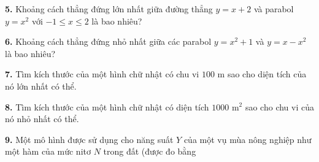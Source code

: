 \documentclass[10pt]{article}
\begin{document}
\begin{minipage}[t]{0.48\textwidth}
\vspace{6pt}
\hangindent=13pt
\textbf{5.} Khoảng cách thẳng đứng lớn nhất giữa đường thẳng $y = x + 2$ và parabol $y = x^2$ với $-1 \leqslant x \leqslant 2$ là bao nhiêu?

\vspace{6pt}
\hangindent=13pt
\textbf{6.} Khoảng cách thẳng đứng nhỏ nhất giữa các parabol $y = x^2 + 1$ và $y = x - x^2$ là bao nhiêu?

\vspace{6pt}
\hangindent=13pt
\textbf{7.} Tìm kích thước của một hình chữ nhật có chu vi $100\text{ m}$ sao cho diện tích của nó lớn nhất có thể.

\vspace{6pt}
\hangindent=13pt
\textbf{8.} Tìm kích thước của một hình chữ nhật có diện tích $1000\text{ m}^2$ sao cho chu vi của nó nhỏ nhất có thể.

\vspace{6pt}
\hangindent=13pt
\textbf{9.} Một mô hình được sử dụng cho năng suất $Y$ của một vụ mùa nông nghiệp như một hàm của mức nitơ $N$ trong đất (được đo bằng

\end{minipage}%
\hfill
\end{document}
